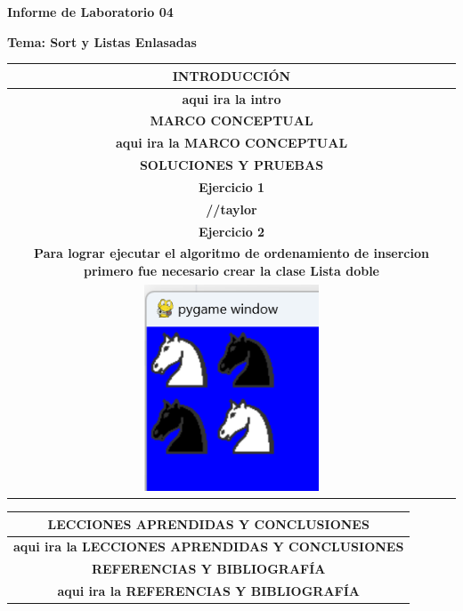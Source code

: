 \documentclass{article}
\newcommand{\itemPracticeNumber}{04}
\newcommand{\itemTheme}{Sort y Listas Enlasadas}
\begin{document}
	
	\vspace*{10px}
	
	\begin{center}	
		\fontsize{17}{17} \textbf{ Informe de Laboratorio \itemPracticeNumber}
	\end{center}
	\centerline{\textbf{\Large Tema: \itemTheme}}

	\begin{table}[H]
		\begin{tabular}{|c|}
			\hline 
			\rowcolor{tablebackground}
			\color{white}\textbf{INTRODUCCIÓN}  \\
			\hline 
			\textbf{aqui ira la intro}  \\
			\hline 
			\rowcolor{tablebackground}
			\color{white}\textbf{MARCO CONCEPTUAL}  \\
			\hline 
			\textbf{aqui ira la MARCO CONCEPTUAL}  \\
			\hline 
			\rowcolor{tablebackground}
			\color{white}\textbf{SOLUCIONES Y PRUEBAS}  \\
			\hline 
			\textbf{Ejercicio 1}  \\
			\textbf{//taylor}  \\
			\textbf{Ejercicio 2}  \\
			\textbf{Para lograr ejecutar el algoritmo de ordenamiento de insercion 
			primero fue necesario crear la clase Lista doble}  \\
			\includegraphics[width=0.4\textwidth,keepaspectratio]{img/e2a.png}\\
			\hline
		\end{tabular}
	\end{table}
	\begin{table}[H]
		\begin{tabular}{|c|}
			\hline 
			\rowcolor{tablebackground}
			\color{white}\textbf{LECCIONES APRENDIDAS Y CONCLUSIONES}  \\
			\hline 
			\textbf{aqui ira la LECCIONES APRENDIDAS Y CONCLUSIONES}  \\
			\hline 
			\rowcolor{tablebackground}
			\color{white}\textbf{REFERENCIAS Y BIBLIOGRAFÍA}  \\
			\hline 
			\textbf{aqui ira la REFERENCIAS Y BIBLIOGRAFÍA}  \\
			\hline 
		\end{tabular}
	\end{table}
\end{document}
